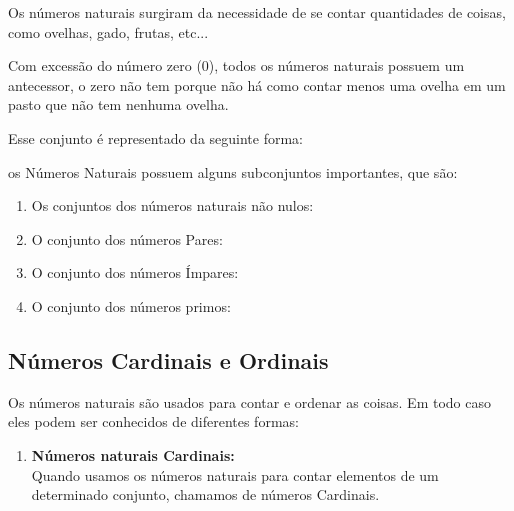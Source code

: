 \begin{multicols*}{2}
	Os números naturais surgiram da necessidade de se contar quantidades de coisas, como ovelhas, gado, frutas, etc...

	Com excessão do número zero (0), todos os números naturais possuem um antecessor, o zero não tem porque não há como contar menos uma ovelha em um pasto que não tem nenhuma ovelha.

	Esse conjunto é representado da seguinte forma:


	os Números Naturais possuem alguns subconjuntos importantes, que são:

	\begin{enumerate}

		\item Os conjuntos dos números naturais não nulos:


		\item O conjunto dos números Pares:


		\item O conjunto dos números Ímpares:


		\item O conjunto dos números primos:


	\end{enumerate}

	\subsection{Números Cardinais e Ordinais}

	Os números naturais são usados para contar e ordenar as coisas. Em todo caso eles podem ser conhecidos de diferentes formas:

	\begin{enumerate}

		\item \textbf{Números naturais Cardinais:}\\

		      Quando usamos os números naturais para contar elementos de um determinado conjunto, chamamos de números Cardinais.


\end{enumerate}
\end{multicols*}
